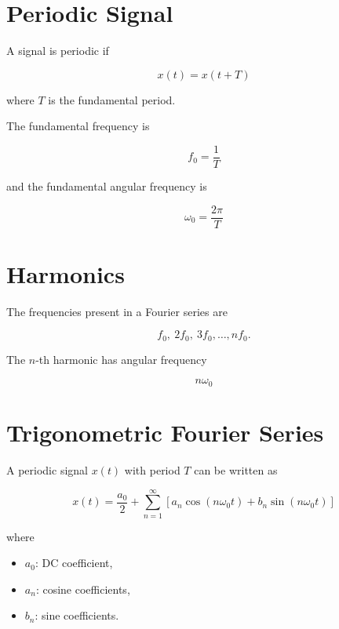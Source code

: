 
\section{Periodic Signal}

A signal is periodic if

\[
\boxed{
x(t)=x(t+T)
}
\]

where \(T\) is the fundamental period.

The fundamental frequency is

\[
\boxed{
f_0=\frac{1}{T}
}
\]

and the fundamental angular frequency is

\[
\boxed{
\omega_0=\frac{2\pi}{T}
}
\]


\section{Harmonics}

The frequencies present in a Fourier series are

\[
f_0,\ 2f_0,\ 3f_0,\ldots,nf_0.
\]

The \(n\)-th harmonic has angular frequency

\[
\boxed{
n\omega_0
}
\]


\section{Trigonometric Fourier Series}

A periodic signal \(x(t)\) with period \(T\) can be written as

\[
\boxed{
x(t)=
\frac{a_0}{2}
+
\sum_{n=1}^{\infty}
\left[
a_n\cos(n\omega_0 t)
+
b_n\sin(n\omega_0 t)
\right]
}
\]

where

\begin{itemize}
\item \(a_0\): DC coefficient,
\item \(a_n\): cosine coefficients,
\item \(b_n\): sine coefficients.
\end{itemize}


